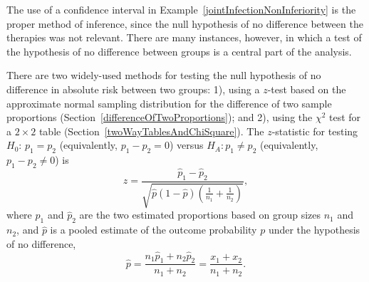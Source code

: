 The use of a confidence interval in Example~\ref{jointInfectionNonInferiority} is the proper method of inference, since the null hypothesis of no difference between the therapies was not relevant.  There are many instances, however, in which a test of the hypothesis of no difference between groups is a central part of the analysis.

There are two widely-used methods for testing the null hypothesis of no difference in absolute risk between two groups: 1), using a $z$-test based on the approximate normal sampling distribution for the difference of two sample proportions (Section~\ref{differenceOfTwoProportions}); and 2), using the $\chi^2$ test for a $2 \times 2$ table (Section~\ref{twoWayTablesAndChiSquare}).   The $z$-statistic for testing $H_0:\, p_1 = p_2$ (equivalently, $p_1 - p_2 = 0$) versus $H_A: p_1 \neq p_2$ (equivalently, $p_1 - p_2 \neq 0$) is
\[z = \dfrac{\hat{p}_1 - \hat{p}_2}{\sqrt{\hat{p}(1-\hat{p})\left(\frac{1}{n_1} + \frac{1}{n_2} \right)}}, \]
where $\hat{p}_1$ and $\hat{p}_2$ are the two estimated proportions based on group sizes $n_1$ and $n_2$, and $\hat{p}$ is a pooled estimate of the outcome probability $p$ under the hypothesis of no difference,
\[\hat{p} = \dfrac{n_{1}\hat{p}_1 + n_{2}\hat{p}_2}{n_{1} + n_{2}} = \dfrac{x_{1} + x_{2}}{n_{1} + n_{2}}. \]

